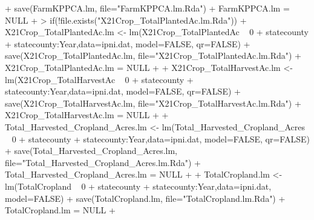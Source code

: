 \documentclass{report}
\begin{document}
\begin{Schunk}
\begin{Sinput}
{+      save(FarmKPPCA.lm, file="FarmKPPCA.lm.Rda")
+      FarmKPPCA.lm = NULL 
+ }
> if(!file.exists("X21Crop_TotalPlantedAc.lm.Rda")) {   
+      X21Crop_TotalPlantedAc.lm <- lm(X21Crop_TotalPlantedAc ~ 0 + statecounty + statecounty:Year,data=ipni.dat, model=FALSE, qr=FALSE)
+      save(X21Crop_TotalPlantedAc.lm, file="X21Crop_TotalPlantedAc.lm.Rda")
+      X21Crop_TotalPlantedAc.lm = NULL
+      
+      X21Crop_TotalHarvestAc.lm <- lm(X21Crop_TotalHarvestAc ~ 0 + statecounty + statecounty:Year,data=ipni.dat, model=FALSE, qr=FALSE)
+      save(X21Crop_TotalHarvestAc.lm, file="X21Crop_TotalHarvestAc.lm.Rda")
+       X21Crop_TotalHarvestAc.lm = NULL
+       
+      Total_Harvested_Cropland_Acres.lm <- lm(Total_Harvested_Cropland_Acres ~ 0 + statecounty + statecounty:Year,data=ipni.dat, model=FALSE, qr=FALSE)
+      save(Total_Harvested_Cropland_Acres.lm, file="Total_Harvested_Cropland_Acres.lm.Rda")
+      Total_Harvested_Cropland_Acres.lm = NULL
+      
+      TotalCropland.lm <- lm(TotalCropland ~ 0 + statecounty + statecounty:Year,data=ipni.dat, model=FALSE)
+      save(TotalCropland.lm, file="TotalCropland.lm.Rda")
+      TotalCropland.lm = NULL
+ }
\end{Sinput}
\end{Schunk}
\end{document}
